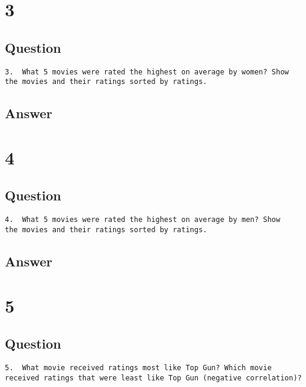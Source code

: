 \documentclass[letterpaper,11pt]{article}
\begin{document}
\newpage

\section*{3}

\subsection*{Question}

\begin{verbatim}
3.  What 5 movies were rated the highest on average by women? Show
the movies and their ratings sorted by ratings.
\end{verbatim}

\newpage
\subsection*{Answer}

\newpage

\section*{4}

\subsection*{Question}

\begin{verbatim}
4.  What 5 movies were rated the highest on average by men? Show
the movies and their ratings sorted by ratings.
\end{verbatim}

\newpage
\subsection*{Answer}

\newpage

\section*{5}

\subsection*{Question}

\begin{verbatim}
5.  What movie received ratings most like Top Gun? Which movie
received ratings that were least like Top Gun (negative correlation)?
\end{verbatim}
\end{document}
